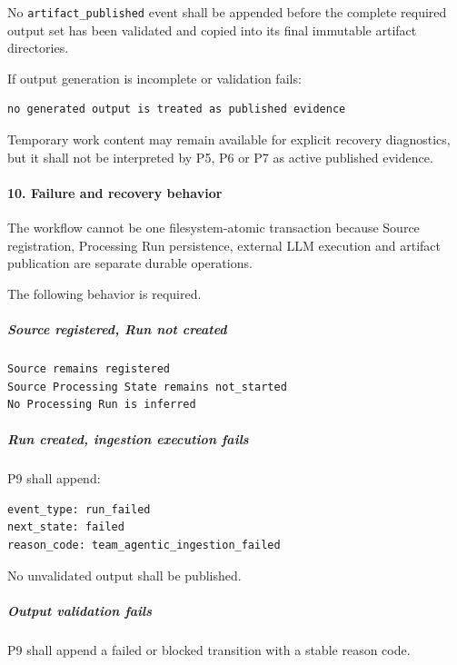 No \texttt{artifact\_published} event shall be appended before the complete required output set has been validated and copied into its final immutable artifact directories.

If output generation is incomplete or validation fails:

\begin{verbatim}
no generated output is treated as published evidence
\end{verbatim}

Temporary work content may remain available for explicit recovery diagnostics, but it shall not be interpreted by P5, P6 or P7 as active published evidence.

\hypertarget{10-failure-and-recovery-behavior}{%
\paragraph{10. Failure and recovery behavior}\label{10-failure-and-recovery-behavior}}

The workflow cannot be one filesystem-atomic transaction because Source registration, Processing Run persistence, external LLM execution and artifact publication are separate durable operations.

The following behavior is required.

\hypertarget{source-registered-run-not-created}{%
\subparagraph{Source registered, Run not created}\label{source-registered-run-not-created}}

\begin{verbatim}
Source remains registered
Source Processing State remains not_started
No Processing Run is inferred
\end{verbatim}

\hypertarget{run-created-ingestion-execution-fails}{%
\subparagraph{Run created, ingestion execution fails}\label{run-created-ingestion-execution-fails}}

P9 shall append:

\begin{verbatim}
event_type: run_failed
next_state: failed
reason_code: team_agentic_ingestion_failed
\end{verbatim}

No unvalidated output shall be published.

\hypertarget{output-validation-fails}{%
\subparagraph{Output validation fails}\label{output-validation-fails}}

P9 shall append a failed or blocked transition with a stable reason code.

